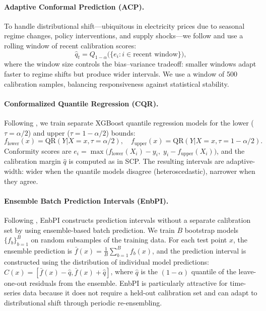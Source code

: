 \documentclass[preprint,12pt]{elsarticle}
\begin{document}
\begin{enumerate}
\paragraph{Adaptive Conformal Prediction (ACP).}
To handle distributional shift---ubiquitous in electricity prices due to seasonal regime changes, policy interventions, and supply shocks---we follow \citet{gibbs2021} and use a rolling window of recent calibration scores:
\begin{equation}
  \hat{q}_t = Q_{1-\alpha}\bigl(\{e_i : i \in \text{recent window}\}\bigr),
  \label{eq:acp}
\end{equation}
where the window size controls the bias--variance tradeoff: smaller windows adapt faster to regime shifts but produce wider intervals. We use a window of 500 calibration samples, balancing responsiveness against statistical stability.

\paragraph{Conformalized Quantile Regression (CQR).}
Following \citet{romano2019}, we train separate XGBoost quantile regression models for the lower ($\tau = \alpha/2$) and upper ($\tau = 1-\alpha/2$) bounds:
\begin{equation}
  f_{\text{lower}}(x) = \text{QR}(Y|X=x, \tau=\alpha/2), \quad f_{\text{upper}}(x) = \text{QR}(Y|X=x, \tau=1-\alpha/2).
  \label{eq:cqr}
\end{equation}
Conformity scores are $e_i = \max\bigl(f_{\text{lower}}(X_i) - y_i, \; y_i - f_{\text{upper}}(X_i)\bigr)$, and the calibration margin $\hat{q}$ is computed as in SCP. The resulting intervals are adaptive-width: wider when the quantile models disagree (heteroscedastic), narrower when they agree.

\paragraph{Ensemble Batch Prediction Intervals (EnbPI).}
Following \citet{barber2023}, EnbPI constructs prediction intervals without a separate calibration set by using ensemble-based batch prediction. We train $B$ bootstrap models $\{f_b\}_{b=1}^B$ on random subsamples of the training data. For each test point $x$, the ensemble prediction is $\bar{f}(x) = \frac{1}{B}\sum_{b=1}^B f_b(x)$, and the prediction interval is constructed using the distribution of individual model predictions: $\hat{C}(x) = [\bar{f}(x) - \hat{q}, \bar{f}(x) + \hat{q}]$, where $\hat{q}$ is the $(1-\alpha)$ quantile of the leave-one-out residuals from the ensemble. EnbPI is particularly attractive for time-series data because it does not require a held-out calibration set and can adapt to distributional shift through periodic re-ensembling.


\end{enumerate}
\end{document}
